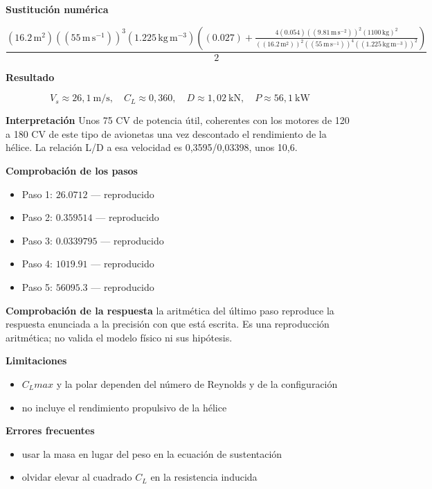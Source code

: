 \documentclass[10pt,openany]{book}
\begin{document}
\begin{tcolorbox}[title={Problema resuelto}, studiumworked, breakable]
\noindent\textbf{Sustitución numérica}

\[
\frac{\left(16.2\,\mathrm{m}^{2}\right) \left(\left(55\,\mathrm{m}\,\mathrm{s}^{-1}\right)\right)^{3} \left(1.225\,\mathrm{kg}\,\mathrm{m}^{-3}\right) \left(\left(0.027\right) + \frac{4 \left(0.054\right) \left(\left(9.81\,\mathrm{m}\,\mathrm{s}^{-2}\right)\right)^{2} \left(1100\,\mathrm{kg}\right)^{2}}{\left(\left(16.2\,\mathrm{m}^{2}\right)\right)^{2} \left(\left(55\,\mathrm{m}\,\mathrm{s}^{-1}\right)\right)^{4} \left(\left(1.225\,\mathrm{kg}\,\mathrm{m}^{-3}\right)\right)^{2}}\right)}{2}
\]

\noindent\textbf{Resultado}

\[
V_s \approx 26{,}1\ \mathrm{m/s},\quad C_L \approx 0{,}360,\quad D \approx 1{,}02\ \mathrm{kN},\quad P \approx 56{,}1\ \mathrm{kW}
\]

\noindent\textbf{Interpretación}
Unos 75 CV de potencia útil, coherentes con los motores de 120 a 180 CV de este tipo de avionetas una vez descontado el rendimiento de la hélice. La relación L/D a esa velocidad es 0,3595/0,03398, unos 10,6.

\noindent\textbf{Comprobación de los pasos}
\begin{itemize}
\item Paso 1: $26.0712$ — reproducido
\item Paso 2: $0.359514$ — reproducido
\item Paso 3: $0.0339795$ — reproducido
\item Paso 4: $1019.91$ — reproducido
\item Paso 5: $56095.3$ — reproducido
\end{itemize}

\noindent\textbf{Comprobación de la respuesta} la aritmética del último paso reproduce la respuesta enunciada a la precisión con que está escrita. Es una reproducción aritmética; no valida el modelo físico ni sus hipótesis.

\noindent\textbf{Limitaciones}
\begin{itemize}
\item \(C_Lmax\) y la polar dependen del número de Reynolds y de la configuración
\item no incluye el rendimiento propulsivo de la hélice
\end{itemize}

\noindent\textbf{Errores frecuentes}
\begin{itemize}
\item usar la masa en lugar del peso en la ecuación de sustentación
\item olvidar elevar al cuadrado \(C_L\) en la resistencia inducida
\end{itemize}
\end{tcolorbox}
\end{document}
